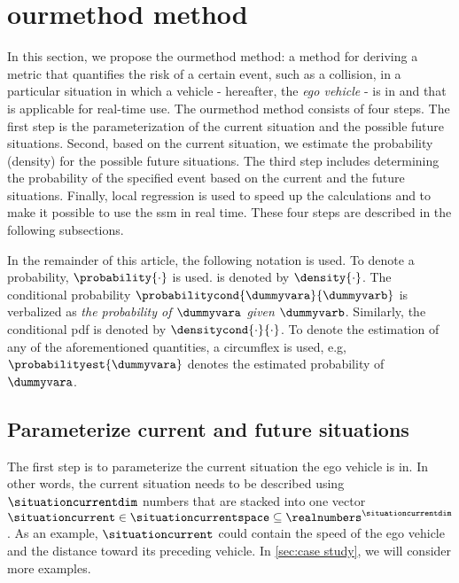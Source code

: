 \section{\acl{ourmethod} method}
\label{sec:method}

In this section, we propose the \cstarta\ac{ourmethod} method: \cenda a method for deriving a metric that quantifies the risk of a certain event, such as a collision, in a particular situation in which a vehicle - hereafter, the \textit{ego vehicle} - is in and that is applicable for real-time use.
\cstarta The \ac{ourmethod} method \cenda consists of four steps. 
The first step is the parameterization of the current situation and the possible future situations.
Second, based on the current situation, we estimate the probability (density) for the possible future situations. 
The third step includes determining the probability of the specified event based on the current and the future situations.
Finally, local regression is used to speed up the calculations and to make it possible to use the \ac{ssm} in real time. 
These four steps are described in the following subsections.

In the remainder of this article, the following notation is used. 
To denote a probability, $\probability{\cdot}$ is used. 
 is denoted by $\density{\cdot}$. 
The conditional probability $\probabilitycond{\dummyvara}{\dummyvarb}$ is verbalized as \textit{the probability of $\dummyvara$ given $\dummyvarb$}. 
Similarly, the conditional \ac{pdf} is denoted by $\densitycond{\cdot}{\cdot}$. 
To denote the estimation of any of the aforementioned quantities, a circumflex is used, e.g, $\probabilityest{\dummyvara}$ denotes the estimated probability of $\dummyvara$.



\subsection{Parameterize current and future situations}
\label{sec:parametrization}

The first step is to parameterize the current situation the ego vehicle is in. 
In other words, the current situation needs to be described using $\situationcurrentdim$ numbers that are stacked into one vector $\situationcurrent \in \situationcurrentspace \subseteq \realnumbers^{\situationcurrentdim}$. 
As an example, $\situationcurrent$ could contain the speed of the ego vehicle and the distance toward its preceding vehicle. 
In \cref{sec:case study}, we will consider more examples.

